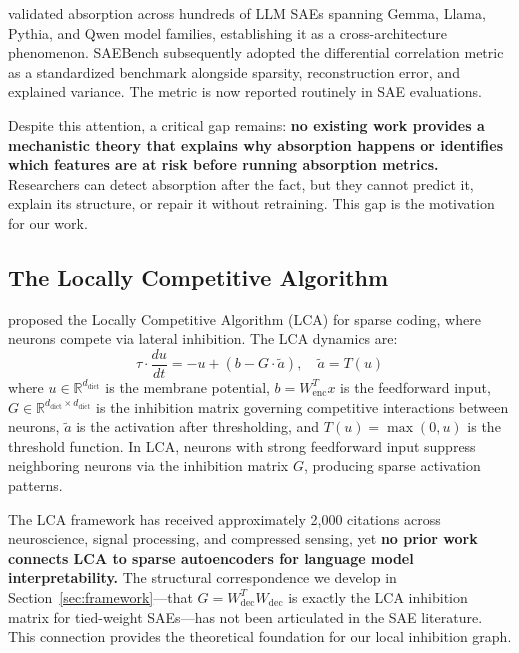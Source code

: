 \documentclass{article}
\begin{document}
\citet{chanin2024quantifying} validated absorption across hundreds of LLM SAEs spanning Gemma, Llama, Pythia, and Qwen model families, establishing it as a cross-architecture phenomenon. SAEBench \citep{karvonen2025saebench} subsequently adopted the \citet{chanin2024quantifying} differential correlation metric as a standardized benchmark alongside sparsity, reconstruction error, and explained variance. The metric is now reported routinely in SAE evaluations.

Despite this attention, a critical gap remains: \textbf{no existing work provides a mechanistic theory that explains why absorption happens or identifies which features are at risk before running absorption metrics.} Researchers can detect absorption after the fact, but they cannot predict it, explain its structure, or repair it without retraining. This gap is the motivation for our work.

\subsection{The Locally Competitive Algorithm}

\citet{rozell2008sparse} proposed the Locally Competitive Algorithm (LCA) for sparse coding, where neurons compete via lateral inhibition. The LCA dynamics are:
\begin{equation}
\tau \cdot \frac{du}{dt} = -u + (b - G \cdot \tilde{a}), \quad \tilde{a} = T(u)
\end{equation}
where $u \in \mathbb{R}^{d_{\text{dict}}}$ is the membrane potential, $b = W_{\text{enc}}^T x$ is the feedforward input, $G \in \mathbb{R}^{d_{\text{dict}} \times d_{\text{dict}}}$ is the inhibition matrix governing competitive interactions between neurons, $\tilde{a}$ is the activation after thresholding, and $T(u) = \max(0, u)$ is the threshold function. In LCA, neurons with strong feedforward input suppress neighboring neurons via the inhibition matrix $G$, producing sparse activation patterns.

The LCA framework has received approximately 2,000 citations across neuroscience, signal processing, and compressed sensing, yet \textbf{no prior work connects LCA to sparse autoencoders for language model interpretability.} The structural correspondence we develop in Section~\ref{sec:framework}---that $G = W_{\text{dec}}^T W_{\text{dec}}$ is exactly the LCA inhibition matrix for tied-weight SAEs---has not been articulated in the SAE literature. This connection provides the theoretical foundation for our local inhibition graph.
\end{document}
